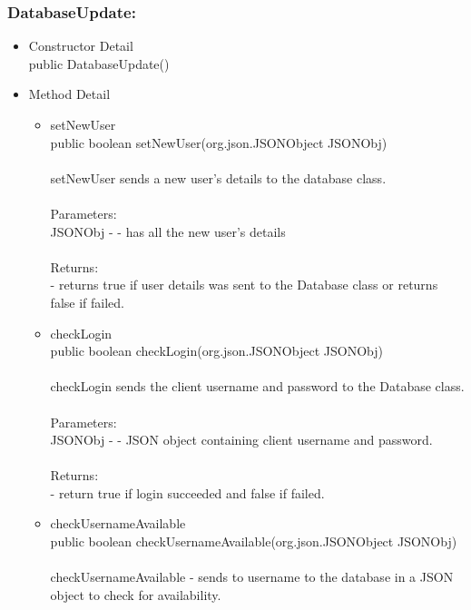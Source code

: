 \documentclass[letterpaper]{article}
\begin{document}
				\vspace{0.2in}
				\subsubsection*{DatabaseUpdate:}
				\vspace{0.1in}	
					\begin{itemize}
						\item	Constructor Detail \\
								public DatabaseUpdate()
						\item	Method Detail
								\begin{itemize}
									\item	setNewUser \\
											public boolean setNewUser(org.json.JSONObject JSONObj) \\ \\
											setNewUser sends a new user's details to the database class. \\ \\
											Parameters: \\
											JSONObj - - has all the new user's details \\ \\
											Returns: \\
											- returns true if user details was sent to the Database class or returns false if failed.
									\item	checkLogin \\
											public boolean checkLogin(org.json.JSONObject JSONObj) \\ \\
											checkLogin sends the client username and password to the Database class. \\ \\
											Parameters: \\
											JSONObj - - JSON object containing client username and password. \\ \\
											Returns: \\
											- return true if login succeeded and false if failed.
									\item	checkUsernameAvailable \\
											public boolean checkUsernameAvailable(org.json.JSONObject JSONObj) \\ \\
											checkUsernameAvailable - sends to username to the database in a JSON object to check for availability. \\ \\

\end{itemize}
\end{itemize}
\end{document}
